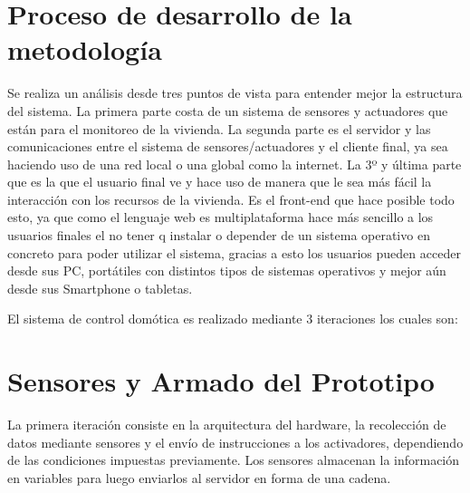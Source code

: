 \documentclass[11pt,letterpaper]{report}
\begin{document}
	\section{ Proceso de desarrollo de la metodología}
	Se realiza un análisis desde tres puntos de vista para entender mejor la estructura del sistema. La primera parte costa de un sistema de sensores y actuadores que están para el monitoreo de la vivienda.  La segunda parte es  el servidor y las comunicaciones entre el sistema de sensores/actuadores  y el cliente final, ya sea  haciendo uso de una red  local o una global como la internet. La 3º y última parte  que es la que el usuario final ve y hace uso de manera que le sea más  fácil la interacción con los recursos de la vivienda. Es el front-end que hace posible todo esto, ya que como el lenguaje web es multiplataforma hace más  sencillo a los usuarios finales el no tener q  instalar o depender de un sistema operativo en concreto para poder utilizar el sistema, gracias a esto los usuarios pueden acceder desde sus  PC,  portátiles con distintos tipos de sistemas operativos y mejor aún desde  sus Smartphone o tabletas.
	
El sistema de control domótica es realizado mediante 3 iteraciones los cuales son:
	\section{Sensores y Armado del Prototipo}
	La primera iteración consiste en la arquitectura del hardware, la recolección de datos mediante sensores y el envío de instrucciones a los activadores, dependiendo de las condiciones impuestas previamente. Los sensores almacenan la información en  variables para luego enviarlos al servidor en forma de una cadena.
\end{document}
